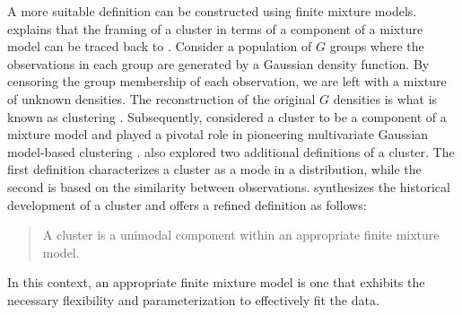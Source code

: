 \documentclass[12pt]{report}
\begin{document}
A more suitable definition can be constructed using finite mixture models. \citet{mcnicholas2016b} explains that the framing of a cluster in terms of a component of a mixture model can be traced back to \citet{tiedeman1955}. Consider a population of $G$ groups where the observations in each group are generated by a Gaussian density function. By censoring the group membership of each observation, we are left with a mixture of unknown densities. The reconstruction of the original $G$ densities is what is known as clustering \citep{tiedeman1955}. Subsequently, \citet{wolfe1963} considered a cluster to be a component of a mixture model and played a pivotal role in pioneering multivariate Gaussian model-based clustering \citep{wolfe1965}. \citet{wolfe1963} also explored two additional definitions of a cluster. The first definition characterizes a cluster as a mode in a distribution, while the second is based on the similarity between observations. \citet{mcnicholas2016a} synthesizes the historical development of a cluster and offers a refined definition as follows:
\begin{quote} 
A cluster is a unimodal component within an appropriate finite mixture model.
\end{quote}
In this context, an appropriate finite mixture model is one that exhibits the necessary flexibility and parameterization to effectively fit the data.




\end{document}
